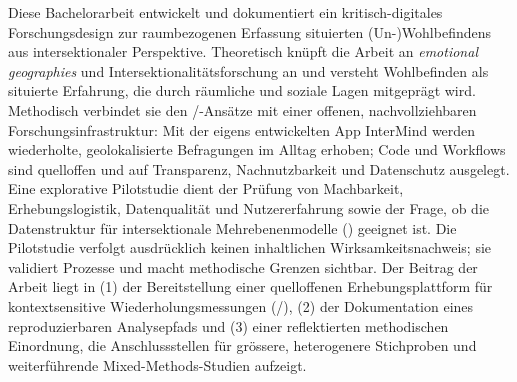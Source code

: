 Diese Bachelorarbeit entwickelt und dokumentiert ein kritisch-digitales Forschungsdesign zur raumbezogenen Erfassung situierten (Un\nobreakdash-)Wohlbefindens aus intersektionaler Perspektive. Theoretisch knüpft die Arbeit an \emph{emotional geographies} und Intersektionalitätsforschung an und versteht Wohlbefinden als situierte Erfahrung, die durch räumliche und soziale Lagen mitgeprägt wird. Methodisch verbindet sie den /-Ansätze mit einer offenen, nachvollziehbaren Forschungsinfrastruktur: Mit der eigens entwickelten App InterMind werden wiederholte, geolokalisierte Befragungen im Alltag erhoben; Code und Workflows sind quelloffen und auf Transparenz, Nachnutzbarkeit und Datenschutz ausgelegt. Eine explorative Pilotstudie dient der Prüfung von Machbarkeit, Erhebungslogistik, Datenqualität und Nutzererfahrung sowie der Frage, ob die Datenstruktur für intersektionale Mehrebenenmodelle () geeignet ist. Die Pilotstudie verfolgt ausdrücklich keinen inhaltlichen Wirksamkeitsnachweis; sie validiert Prozesse und macht methodische Grenzen sichtbar. Der Beitrag der Arbeit liegt in (1) der Bereitstellung einer quelloffenen  Erhebungsplattform für kontextsensitive Wiederholungsmessungen (/), (2) der Dokumentation eines reproduzierbaren Analysepfads und (3) einer reflektierten methodischen Einordnung, die Anschlussstellen für grössere, heterogenere Stichproben und weiterführende Mixed-Methods-Studien aufzeigt.